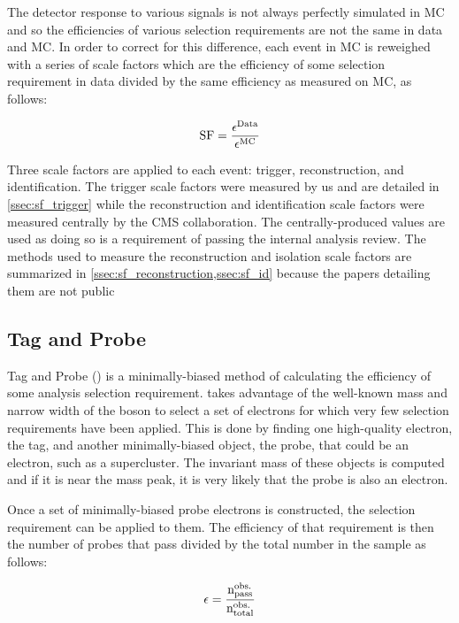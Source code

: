 The detector response to various signals is not always perfectly simulated in
MC and so the efficiencies of various selection requirements are not the same
in data and MC. In order to correct for this difference, each event in MC is
reweighed with a series of scale factors which are the efficiency of some
selection requirement in data divided by the same efficiency as measured on MC,
as follows:

\begin{equation}
    \label{eq:sf}
    \text{SF} = \frac{\epsilon^{\text{Data}}}{\epsilon^{\text{MC}}}
\end{equation}

Three scale factors are applied to each event: trigger, reconstruction, and
identification. The trigger scale factors were measured by us and are detailed
in \cref{ssec:sf_trigger} while the reconstruction and identification scale
factors were measured centrally by the CMS collaboration. The
centrally-produced values are used as doing so is a requirement of passing the
internal analysis review. The methods used to measure the reconstruction and
isolation scale factors are summarized in
\cref{ssec:sf_reconstruction,ssec:sf_id} because the papers detailing them are
not public

\subsection{Tag and Probe}

Tag and Probe (\TnP) is a minimally-biased method of calculating the efficiency
of some analysis selection requirement. \TnP takes advantage of the well-known
mass and narrow width of the \Z boson to select a set of electrons for which
very few selection requirements have been applied. This is done by finding one
high-quality electron, the tag, and another minimally-biased object, the probe,
that could be an electron, such as a supercluster. The invariant mass of these
objects is computed and if it is near the \Z mass peak, it is very likely that
the probe is also an electron.

Once a set of minimally-biased probe electrons is constructed, the selection
requirement can be applied to them. The efficiency of that requirement is then
the number of probes that pass divided by the total number in the sample as
follows:

\begin{equation}
    \label{eq:eff}
    \epsilon = \frac{
        \text{n}^{\text{obs.}}_{\text{pass}}
    }{
        \text{n}^{\text{obs.}}_{\text{total}}
    }
\end{equation}


